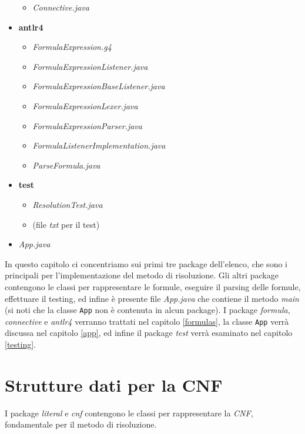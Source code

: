 \documentclass[a4paper,12pt]{report}
\begin{document}
\begin{itemize}
\begin{itemize}
            \item \emph{Connective.java}
        \end{itemize}
    \item \textbf{antlr4}
        \begin{itemize}
            \item \emph{FormulaExpression.g4}
            \item \emph{FormulaExpressionListener.java}
            \item \emph{FormulaExpressionBaseListener.java}
            \item \emph{FormulaExpressionLexer.java}
            \item \emph{FormulaExpressionParser.java}
            \item \emph{FormulaListenerImplementation.java}
            \item \emph{ParseFormula.java}
        \end{itemize}
    \item \textbf{test}
        \begin{itemize}
            \item \emph{ResolutionTest.java}
            \item (file \emph{txt} per il test)
        \end{itemize}
    \item \emph{App.java}
\end{itemize}
In questo capitolo ci concentriamo sui primi tre package dell'elenco, che sono i principali per l'implementazione del metodo di risoluzione. Gli altri package contengono le classi per rappresentare le formule, eseguire il parsing delle formule, effettuare il testing, ed infine è presente file \emph{App.java} che contiene il metodo \emph{main} (si noti che la classe \texttt{App} non è contenuta in alcun package). I package \emph{formula}, \emph{connective} e \emph{antlr4} verranno trattati nel capitolo \ref{formulas}, la classe \texttt{App} verrà discussa nel capitolo \ref{app}, ed infine il package \emph{test} verrà esaminato nel capitolo \ref{testing}.


\section{Strutture dati per la CNF}
I package \emph{literal} e \emph{cnf} contengono le classi per rappresentare la \emph{CNF}, fondamentale per il metodo di risoluzione.
\end{document}
